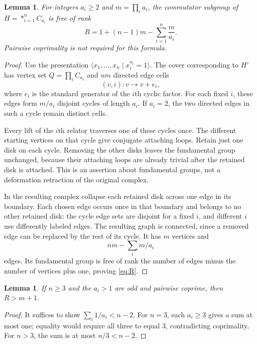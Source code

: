 \documentclass[11pt]{article}
\newtheorem{lemma}[theorem]{Lemma}
\theoremstyle{remark}
\begin{document}
\begin{lemma}\label{lem:cyclic-cover}
For integers $a_i\geq2$ and $m=\prod_i a_i$, the commutator subgroup of $H=*_{i=1}^n C_{a_i}$ is free of rank
\begin{equation}\label{eq:R}
 R=1+(n-1)m-\sum_{i=1}^n\frac{m}{a_i}.
\end{equation}
Pairwise coprimality is not required for this formula.
\end{lemma}
\begin{proof}
Use the presentation $\langle x_1,\ldots,x_n\mid x_i^{a_i}=1\rangle$. The cover corresponding to $H'$ has vertex set $Q=\prod_i C_{a_i}$ and $nm$ directed edge cells
\[
 (v,i):v\longrightarrow v+e_i,
\]
where $e_i$ is the standard generator of the $i$th cyclic factor. For each fixed $i$, these edges form $m/a_i$ disjoint cycles of length $a_i$. If $a_i=2$, the two directed edges in such a cycle remain distinct cells.

Every lift of the $i$th relator traverses one of these cycles once. The different starting vertices on that cycle give conjugate attaching loops. Retain just one disk on each cycle. Removing the other disks leaves the fundamental group unchanged, because their attaching loops are already trivial after the retained disk is attached. This is an assertion about fundamental groups, not a deformation retraction of the original complex.

In the resulting complex collapse each retained disk across one edge in its boundary. Each chosen edge occurs once in that boundary and belongs to no other retained disk: the cycle edge sets are disjoint for a fixed $i$, and different $i$ use differently labeled edges. The resulting graph is connected, since a removed edge can be replaced by the rest of its cycle. It has $m$ vertices and
\[
 nm-\sum_i m/a_i
\]
edges. Its fundamental group is free of rank the number of edges minus the number of vertices plus one, proving \eqref{eq:R}.
\end{proof}

\begin{lemma}\label{lem:odd}
If $n\geq3$ and the $a_i>1$ are odd and pairwise coprime, then $R>m+1$.
\end{lemma}
\begin{proof}
It suffices to show $\sum_i1/a_i<n-2$. For $n=3$, each $a_i\geq3$ gives a sum at most one; equality would require all three to equal $3$, contradicting coprimality. For $n>3$, the sum is at most $n/3<n-2$.
\end{proof}
\end{document}

